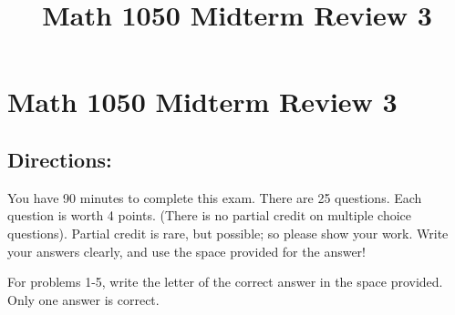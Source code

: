\documentclass{ximera}
\title{Math 1050 Midterm Review 3}
\begin{document}
\section*{Math 1050 Midterm Review 3}

\subsection*{Directions:} You have 90 minutes to complete this exam. There are 25 questions. Each question is worth 4 points. (There is no partial credit on multiple choice questions). Partial credit is rare, but possible; so please show your work. Write your answers clearly, and use the space provided for the answer!

For problems 1-5, write the letter of the correct answer in the space provided. Only one answer is correct.
\end{document}
